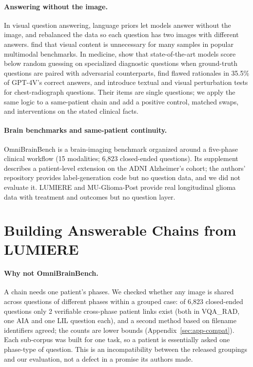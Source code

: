 \documentclass[11pt]{article}
\begin{document}
\paragraph{Answering without the image.} In visual question answering, language priors let models answer without the image, and \citet{goyal2017making} rebalanced the data so each question has two images with different answers. \citet{chen2024right} find that visual content is unnecessary for many samples in popular multimodal benchmarks. In medicine, \citet{yan2025worse} show that state-of-the-art models score below random guessing on specialized diagnostic questions when ground-truth questions are paired with adversarial counterparts, \citet{jin2024hidden} find flawed rationales in 35.5\% of GPT-4V's correct answers, and \citet{nguyen2025localizing} introduce textual and visual perturbation tests for chest-radiograph questions. Their items are single questions; we apply the same logic to a same-patient chain and add a positive control, matched swaps, and interventions on the stated clinical facts.

\paragraph{Brain benchmarks and same-patient continuity.} OmniBrainBench \citep{peng2026omnibrainbench} is a brain-imaging benchmark organized around a five-phase clinical workflow (15 modalities; 6,823 closed-ended questions). Its supplement describes a patient-level extension on the ADNI Alzheimer's cohort; the authors' repository provides label-generation code but no question data, and we did not evaluate it. LUMIERE \citep{suter2022lumiere} and MU-Glioma-Post \citep{muglioma2025post} provide real longitudinal glioma data with treatment and outcomes but no question layer.

\section{Building Answerable Chains from LUMIERE}
\label{sec:lumiere}

\paragraph{Why not OmniBrainBench.} A chain needs one patient's phases. We checked whether any image is shared across questions of different phases within a grouped case: of 6,823 closed-ended questions only 2 verifiable cross-phase patient links exist (both in VQA\_RAD, one AIA and one LIL question each), and a second method based on filename identifiers agreed; the counts are lower bounds (Appendix~\ref{sec:app-compat}). Each sub-corpus was built for one task, so a patient is essentially asked one phase-type of question. This is an incompatibility between the released groupings and our evaluation, not a defect in a promise its authors made.
\end{document}
